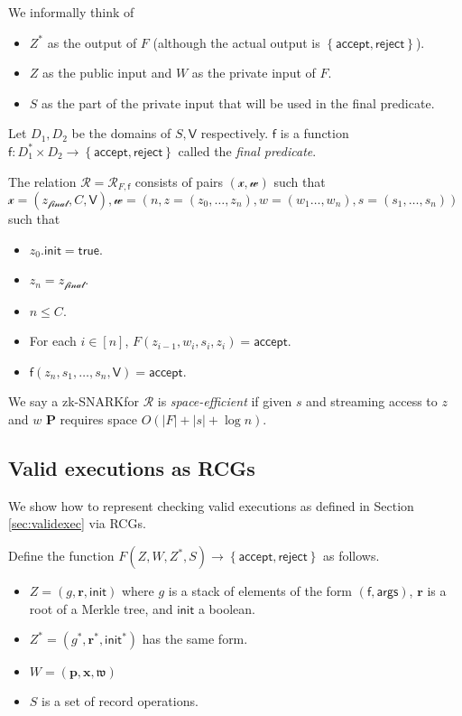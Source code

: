 \documentclass[11pt]{article} %
\newcommand{\rej}{\ensuremath{\mathsf{reject}}\xspace}
\newcommand{\acc}{\ensuremath{\mathsf{accept}}\xspace}
\newcommand{\prv}{\ensuremath{\mathsf{\mathbf{P}}}\xspace}
\newcommand{\inpF}{\ensuremath{\mathscr{x}}\xspace}
\newcommand{\witF}{\ensuremath{\mathscr{w}}\xspace}
\newcommand{\rel}{\ensuremath{\mathcal{R}}\xspace}
\newcommand{\set}[1]{\ensuremath{\left\{#1\right\}}\xspace}
\newcommand{\f}{\ensuremath{\mathsf{f}}\xspace}
\newcommand{\zfin}{\ensuremath{z_{\mathscr{final}}}\xspace}
\newcommand{\init}{\ensuremath{\mathsf{init}}\xspace}
\newcommand{\true}{\ensuremath{\mathsf{true}}\xspace}
\newcommand{\witapp}{\ensuremath{\mathfrak{w}}\xspace}
\newcommand{\instnoops}{\ensuremath{\mathbf{x}}\xspace}
\renewcommand{\path}{\ensuremath{\mathbf{p}}\xspace}
\renewcommand{\root}{\ensuremath{\mathbf{r}}\xspace}
\newcommand{\args}{\ensuremath{\mathsf{args}}\xspace}
\newcommand{\recset}{\ensuremath{\mathsf{V}}\xspace}
\newcommand{\finpred}{\ensuremath{\mathsf{f}}\xspace}
\newcommand{\zksnark}{zk-SNARK\;}
\begin{document}
We informally think of 
\begin{itemize}
\item $Z^*$ as the output of $F$ (although the actual output is \set{\acc,\rej}).

\item $Z$ as the public input and $W$ as the private input of $F$.
\item $S$ as the part of the private input that will be used in the final predicate.
\end{itemize}

Let $D_1,D_2$ be the domains of $S,\recset$ respectively. \finpred is a function
$\finpred:D_1^*\times D_2 \to \set{\acc,\rej}$ called the \emph{final predicate}.

The relation $\rel=\rel_{F,\finpred}$ consists of pairs $(\inpF,\witF)$ such that
$\inpF=(\zfin,C,\recset),\witF=(n,z=(z_0,\ldots,z_n),w=(w_1\ldots,w_n),s=(s_1,\ldots,s_n))$ such that
\begin{itemize}
 \item $z_0.\init = \true$.
 \item $z_n=\zfin$.
 \item $n\leq C$.
 \item For each $i\in [n]$, $F(z_{i-1},w_i,s_i,z_i)=\acc$.
 \item $\finpred(z_n,s_1,\ldots,s_n,\recset)=\acc$.
\end{itemize}


We say a \zksnark for \rel is \emph{space-efficient} if given $s$ and streaming access
to $z$ and $w$ \prv requires space $O(|F|+|s|+\log n)$.


\subsection{Valid executions as RCGs}\label{sec:exec->RFC}
We show how to represent checking valid executions as defined in Section \ref{sec:validexec} via RCGs.

Define the function $F(Z,W,Z^*,S)\to \set{\acc,\rej}$ as follows.
\begin{itemize}
 \item $Z=(g,\root,\init)$ where $g$ is a stack of elements of the form $(\f,\args)$, \root is a root of a Merkle tree, and \init a boolean.
 \item $Z^*=(g^*,\root^*,\init^*)$ has the same form.
 \item $W=(\path,\instnoops,\witapp)$
 \item $S$ is a set of record operations.
\end{itemize}
\end{document}
